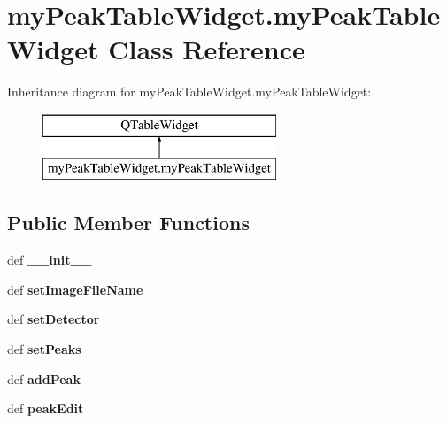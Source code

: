 \hypertarget{classmyPeakTableWidget_1_1myPeakTableWidget}{\section{my\-Peak\-Table\-Widget.\-my\-Peak\-Table\-Widget Class Reference}
\label{classmyPeakTableWidget_1_1myPeakTableWidget}
}
Inheritance diagram for my\-Peak\-Table\-Widget.\-my\-Peak\-Table\-Widget\-:\begin{figure}[H]
\begin{center}
\leavevmode
\includegraphics[height=2.000000cm]{classmyPeakTableWidget_1_1myPeakTableWidget}
\end{center}
\end{figure}
\subsection*{Public Member Functions}
\begin{DoxyCompactItemize}
\item 
\hypertarget{classmyPeakTableWidget_1_1myPeakTableWidget_a112e9c9fe94f89bee7313906355d6c8f}{def {\bfseries \-\_\-\-\_\-init\-\_\-\-\_\-}}\label{classmyPeakTableWidget_1_1myPeakTableWidget_a112e9c9fe94f89bee7313906355d6c8f}

\item 
\hypertarget{classmyPeakTableWidget_1_1myPeakTableWidget_abc9980e6816ae93b1302da488b1eb83b}{def {\bfseries set\-Image\-File\-Name}}\label{classmyPeakTableWidget_1_1myPeakTableWidget_abc9980e6816ae93b1302da488b1eb83b}

\item 
\hypertarget{classmyPeakTableWidget_1_1myPeakTableWidget_a30d9b900b3a8eb5fac45aacdd1355b4c}{def {\bfseries set\-Detector}}\label{classmyPeakTableWidget_1_1myPeakTableWidget_a30d9b900b3a8eb5fac45aacdd1355b4c}

\item 
\hypertarget{classmyPeakTableWidget_1_1myPeakTableWidget_a3c7bc1e38db2eb6e0458a438a753f6c3}{def {\bfseries set\-Peaks}}\label{classmyPeakTableWidget_1_1myPeakTableWidget_a3c7bc1e38db2eb6e0458a438a753f6c3}

\item 
\hypertarget{classmyPeakTableWidget_1_1myPeakTableWidget_aa4aed89efa31348e87d73f711d996daf}{def {\bfseries add\-Peak}}\label{classmyPeakTableWidget_1_1myPeakTableWidget_aa4aed89efa31348e87d73f711d996daf}

\item 
\hypertarget{classmyPeakTableWidget_1_1myPeakTableWidget_ac06c362f6d4a47181fbcc0fe2e78a2cb}{def {\bfseries peak\-Edit}}\label{classmyPeakTableWidget_1_1myPeakTableWidget_ac06c362f6d4a47181fbcc0fe2e78a2cb}

\end{DoxyCompactItemize}
